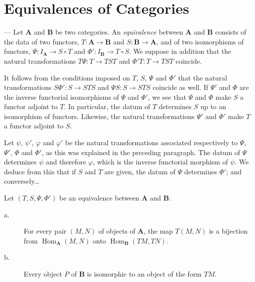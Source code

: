 
\section{Equivalences of Categories}
--- Let $\mathbf{A}$ and $\mathbf{B}$ be two categories. An
\emph{equivalence} between $\mathbf{A}$ and $\mathbf{B}$ consists of the
data of two functors, $T\colon \mathbf{A}\to\mathbf{B}$ and
$S\colon \mathbf{B}\to\mathbf{A}$, and of two isomorphisms of functors,
$\Psi\colon I_{\mathbf{A}}\to S\circ T$ and
$\Phi'\colon I_{\mathbf{B}}\to T\circ S$. We suppose in addition that the
natural transformations $T\Psi\colon T\to TST$ and
$\Phi'T\colon T\to TST$ coincide.

It follows from the conditions imposed on $T$, $S$, $\Psi$ and $\Phi'$
that the natural transformations $S\Phi'\colon S\to STS$ and
$\Psi S\colon S\to STS$ coincide as well. If $\Psi'$ and $\Phi$ are the
inverse functorial isomorphisms of $\Psi$ and $\Phi'$, we see that $\Psi$
and $\Phi$ make $S$ a functor adjoint to $T$. In particular, the datum of
$T$ determines $S$ up to an isomorphism of functors. Likewise, the natural
transformations $\Psi'$ and $\Phi'$ make $T$ a functor adjoint to $S$.

Let $\psi$, $\psi'$, $\varphi$ and $\varphi'$ be the natural
transformations associated respectively to $\Psi$, $\Psi'$, $\Phi$ and
$\Phi'$, as this was explained in the preceding paragraph. The datum of
$\Psi$ determines $\psi$ and therefore $\varphi$, which is the inverse
functorial morphism of $\psi$. We deduce from this that if $S$ and $T$
are given, the datum of $\Psi$ determines $\Phi'$; and conversely\ldots

\begin{lemma}\label{lem:equivalence}
Let $(T,S,\Psi,\Phi')$ be an equivalence between $\mathbf{A}$ and
$\mathbf{B}$:
\begin{description}
\item[\normalfont a.] For every pair $(M,N)$ of objects of $\mathbf{A}$,
      the map $T(M,N)$ is a bijection from
      $\operatorname{Hom}_{\mathbf{A}}(M,N)$ onto
      $\operatorname{Hom}_{\mathbf{B}}(TM,TN)$.
\item[\normalfont b.] Every object $P$ of $\mathbf{B}$ is isomorphic to
      an object of the form $TM$.
\end{description}
\end{lemma}

